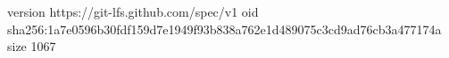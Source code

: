 version https://git-lfs.github.com/spec/v1
oid sha256:1a7e0596b30fdf159d7e1949f93b838a762e1d489075c3cd9ad76cb3a477174a
size 1067
